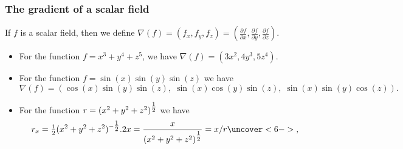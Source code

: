 \documentclass[9pt]{beamer}
\begin{document}

\begin{frame}[t]
 \frametitle{The gradient of a scalar field}

 If $f$ is a scalar field, then we define
 $\displaystyle \nabla(f) = (f_x,f_y,f_z) =
     \left(\frac{\partial f}{\partial x},
           \frac{\partial f}{\partial y},
           \frac{\partial f}{\partial z}\right).
 $\\

 \begin{itemize}
  \item<3->[(a)] For the function $f=x^3+y^4+z^5$, we have 
   $\nabla(f)=(3x^2,4y^3,5z^4)$.
  \item<4->[(b)] For the function $f=\sin(x)\sin(y)\sin(z)$ we have 
   \[ \nabla(f)=(\cos(x)\sin(y)\sin(z),\;
                 \sin(x)\cos(y)\sin(z),\;
                 \sin(x)\sin(y)\cos(z)).
   \]
  \item<5->[(c)] For the function $r=(x^2+y^2+z^2)^{\tfrac{1}{2}}$ we have 
   \[ r_x = \half(x^2+y^2+z^2)^{-\half}.2x =
       \frac{x}{(x^2+y^2+z^2)^{\half}} = x/r\uc<6->{,}
   \]
 \end{itemize}
\end{frame}
\end{document}
